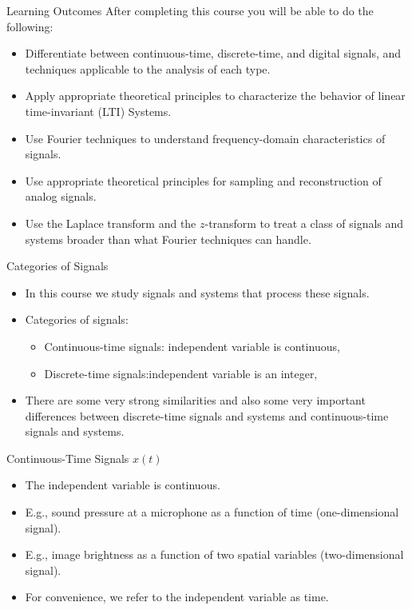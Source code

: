 \begin{frame}{Learning Outcomes}
    After completing this course you will be able to do the following:
    \begin{itemize}[<+->]
        \item Differentiate between continuous-time, discrete-time, and digital signals, and techniques applicable to the analysis of each type.
        \item Apply appropriate theoretical principles to characterize the behavior of linear time-invariant (LTI) Systems.
        \item Use Fourier techniques to understand frequency-domain characteristics of signals.
        \item Use appropriate theoretical principles for sampling and reconstruction of analog signals.
        \item Use the Laplace transform and the $z$-transform to treat a class of signals and systems broader than what Fourier techniques can handle.
    \end{itemize}
\end{frame}


\begin{frame}{Categories of Signals}
    \begin{itemize}[<+->]
        \item In this course we study signals and systems that process these signals.
        \item Categories of signals:
            \begin{itemize}
                \item Continuous-time signals: independent variable is continuous, 
                \item Discrete-time signals:independent variable is an integer,  
            \end{itemize}
        \item There are some very strong similarities and also some very important differences between discrete-time signals and systems and continuous-time signals and systems.
    \end{itemize}
\end{frame}


\begin{frame}{Continuous-Time Signals $x(t)$}
    \begin{itemize}
        \item The independent variable is continuous.
        \item E.g., sound pressure at a microphone as a function of time (one-dimensional signal).
        \item E.g., image brightness as a function of two spatial variables (two-dimensional signal).
        \item For convenience, we refer to the independent variable as time.
    \end{itemize}
\end{frame}


